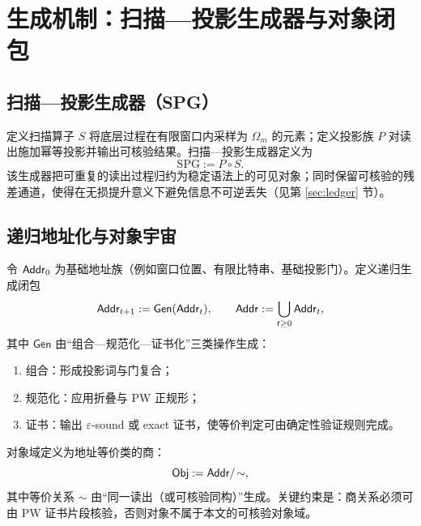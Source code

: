 \section{生成机制：扫描—投影生成器与对象闭包}

\subsection{扫描—投影生成器（SPG）}
定义扫描算子 $S$ 将底层过程在有限窗口内采样为 $\Omega_m$ 的元素；定义投影族 $P$ 对读出施加幂等投影并输出可核验结果。扫描—投影生成器定义为
$$
\mathrm{SPG} := P\circ S.
$$
该生成器把可重复的读出过程归约为稳定语法上的可见对象；同时保留可核验的残差通道，使得在无损提升意义下避免信息不可逆丢失（见第 \ref{sec:ledger} 节）。

\subsection{递归地址化与对象宇宙}
令 $\mathsf{Addr}_0$ 为基础地址族（例如窗口位置、有限比特串、基础投影门）。定义递归生成闭包
$$
\mathsf{Addr}_{t+1} := \mathsf{Gen}(\mathsf{Addr}_t),
\qquad
\mathsf{Addr} := \bigcup_{t\ge 0}\mathsf{Addr}_t,
$$
其中 $\mathsf{Gen}$ 由“组合—规范化—证书化”三类操作生成：
\begin{enumerate}
  \item 组合：形成投影词与门复合；
  \item 规范化：应用折叠与 PW 正规形；
  \item 证书：输出 $\varepsilon$-sound 或 exact 证书，使等价判定可由确定性验证规则完成。
\end{enumerate}

对象域定义为地址等价类的商：
$$
\mathsf{Obj} := \mathsf{Addr}/\!\sim,
$$
其中等价关系 $\sim$ 由“同一读出（或可核验同构）”生成。关键约束是：商关系必须可由 PW 证书片段核验，否则对象不属于本文的可核验对象域。

